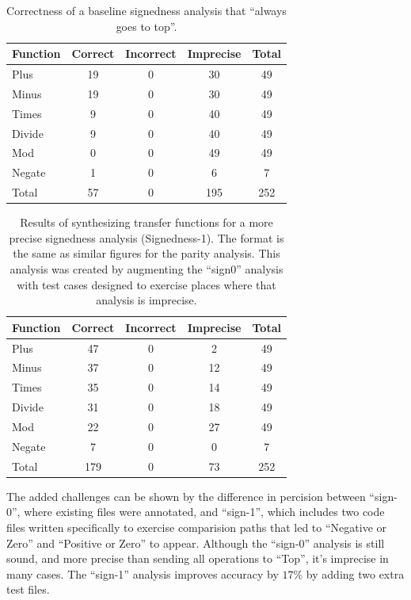 \documentclass[10pt,conference]{IEEEtran}
\begin{document}
\begin{table}
\centering
 \begin{tabular}{l c c c c }
  
  Function & Correct & Incorrect & Imprecise & Total\\ 
  \midrule
  Plus & 19 & 0 & 30 & 49 \\
  Minus & 19 & 0 & 30 & 49 \\
  Times & 9 & 0 & 40 & 49 \\
  Divide & 9 & 0 & 40 & 49 \\
  Mod & 0 & 0 & 49 & 49 \\
  Negate & 1 & 0 & 6 & 7 \\
  \midrule
  Total & 57 & 0 & 195 & 252 \\
 \end{tabular}
 \caption{Correctness of a baseline signedness analysis
 that ``always goes to top''.}
 \label{tab-topsign}
\end{table}


\begin{table}
\centering
 \begin{tabular}{l c c c c }
  
  Function & Correct & Incorrect & Imprecise & Total\\ 
  \midrule
  Plus & 47 & 0 & 2 & 49 \\
  Minus & 37 & 0 & 12 & 49 \\
  Times & 35 & 0 & 14 & 49 \\
  Divide & 31 & 0 & 18 & 49 \\
  Mod & 22 & 0 & 27 & 49 \\
  Negate & 7 & 0 & 0 & 7 \\
  \midrule
  Total & 179 & 0 & 73 & 252 \\
 \end{tabular}
 \caption{Results of synthesizing transfer functions
 for a more precise signedness analysis (Signedness-1). The format is the same
 as similar figures for the parity analysis. This analysis was
 created by augmenting the ``sign0'' analysis with test cases
 designed to exercise places where that analysis is imprecise.}
 \label{tab-sign1}
\end{table}

The added challenges can be shown by the difference in percision between ``sign-0'', where
existing files were annotated, and ``sign-1'', which includes two code files written 
specifically to exercise comparision paths that led to ``Negative or Zero'' and ``Positive or Zero''
to appear.  Although the ``sign-0'' analysis is still sound, and more precise than 
sending all operations to ``Top'', it's imprecise in many cases.  The ``sign-1'' analysis 
improves accuracy by \(17\%\) by adding two extra test files.
\end{document}
